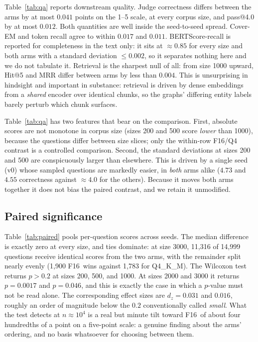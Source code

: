 \documentclass[conference, table]{IEEEtran}
\newcommand{\fsixteen}{F16}
\newcommand{\qfour}{Q4\_K\_M}
\begin{document}
\noindent
Table~\ref{tab:qa} reports downstream quality. Judge correctness differs between the arms by at most $0.041$ points on the 1--5 scale, at every corpus size, and pass@4.0 by at most $0.012$. Both quantities are well inside the seed-to-seed spread. Cover-EM and token recall agree to within $0.017$ and $0.011$. BERTScore-recall is reported for completeness in the text only: it sits at $\approx 0.85$ for every size and both arms with a standard deviation $\leq 0.002$, so it separates nothing here and we do not tabulate it. Retrieval is the sharpest null of all: from size 1000 upward, Hit@5 and MRR differ between arms by less than $0.004$. This is unsurprising in hindsight and important in substance: retrieval is driven by dense embeddings from a \emph{shared} encoder over identical chunks, so the graphs' differing entity labels barely perturb which chunk surfaces.

\noindent
Table~\ref{tab:qa} has two features that bear on the comparison. First, absolute scores are not monotone in corpus size (sizes 200 and 500 score \emph{lower} than 1000), because the questions differ between size slices; only the within-row F16/Q4 contrast is a controlled comparison. Second, the standard deviations at sizes 200 and 500 are conspicuously larger than elsewhere. This is driven by a single seed (v0) whose sampled questions are markedly easier, in \emph{both} arms alike ($4.73$ and $4.55$ correctness against $\approx 4.0$ for the others). Because it moves both arms together it does not bias the paired contrast, and we retain it unmodified.



\subsection{Paired significance}

\noindent
Table~\ref{tab:paired} pools per-question scores across seeds. The median difference is exactly zero at every size, and ties dominate: at size 3000, 11{,}316 of 14{,}999 questions receive identical scores from the two arms, with the remainder split nearly evenly (1{,}900 \fsixteen\ wins against 1{,}783 for \qfour). The Wilcoxon test returns $p > 0.2$ at sizes 200, 500, and 1000. At sizes 2000 and 3000 it returns $p = 0.0017$ and $p = 0.046$, and this is exactly the case in which a $p$-value must not be read alone. The corresponding effect sizes are $d_z = 0.031$ and $0.016$, roughly an order of magnitude below the $0.2$ conventionally called \emph{small}. What the test detects at $n \approx 10^4$ is a real but minute tilt toward \fsixteen\ of about four hundredths of a point on a five-point scale: a genuine finding about the arms' ordering, and no basis whatsoever for choosing between them.
\end{document}
